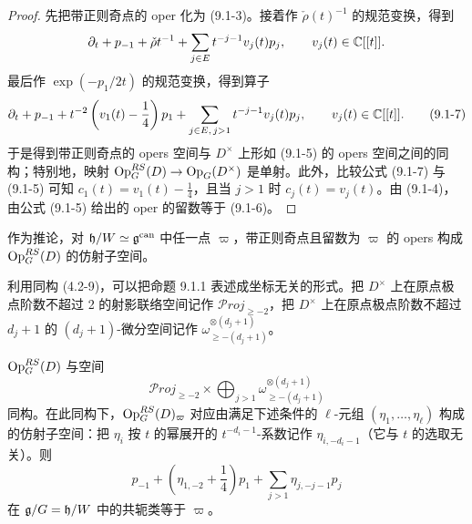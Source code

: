 \begin{proof}
先把带正则奇点的 oper 化为 (9.1-3)。接着作 $\check\rho(t)^{-1}$ 的规范变换，得到
\[
\partial_t + p_{-1} + \check\rho t^{-1} + \sum_{j\in E}t^{-j-1}v_j(t)p_j,\qquad v_j(t)\in\mathbb{C}[[t]].
\]
最后作 $\exp(-p_1/2t)$ 的规范变换，得到算子
\begin{equation}
\partial_t + p_{-1} + t^{-2}\left(v_1(t)-\frac{1}{4}\right)p_1 + \sum_{j\in E,\,j>1}t^{-j-1}v_j(t)p_j,\qquad v_j(t)\in\mathbb{C}[[t]].
\tag{9.1-7}
\end{equation}
于是得到带正则奇点的 opers 空间与 $D^\times$ 上形如 (9.1-5) 的 opers 空间之间的同构；特别地，映射 $\operatorname{Op}^{RS}_G(D)\to\operatorname{Op}_G(D^\times)$ 是单射。此外，比较公式 (9.1-7) 与 (9.1-5) 可知 $c_1(t) = v_1(t)-\frac14$，且当 $j>1$ 时 $c_j(t)=v_j(t)$。由 (9.1-4)，由公式 (9.1-5) 给出的 oper 的留数等于 (9.1-6)。
\end{proof}


作为推论，对 $\mathfrak{h}/W\simeq\mathfrak{g}^{\mathrm{can}}$ 中任一点 $\varpi$，带正则奇点且留数为 $\varpi$ 的 opers 构成 $\operatorname{Op}^{RS}_G(D)$ 的仿射子空间。

利用同构 (4.2-9)，可以把命题 9.1.1 表述成坐标无关的形式。把 $D^\times$ 上在原点极点阶数不超过 2 的射影联络空间记作 $\mathcal{P}roj_{\ge-2}$，把 $D^\times$ 上在原点极点阶数不超过 $d_j+1$ 的 $(d_j+1)$-微分空间记作 $\omega^{\otimes(d_j+1)}_{\ge-(d_j+1)}$。

\begin{corollary}
$\operatorname{Op}^{RS}_G(D)$ 与空间
\[
\mathcal{P}roj_{\ge-2}\times\bigoplus_{j>1}\omega^{\otimes(d_j+1)}_{\ge-(d_j+1)}
\]
同构。在此同构下，$\operatorname{Op}^{RS}_G(D)_\varpi$ 对应由满足下述条件的 $\ell$-元组 $(\eta_1,\dots,\eta_\ell)$ 构成的仿射子空间：把 $\eta_i$ 按 $t$ 的幂展开的 $t^{-d_i-1}$-系数记作 $\eta_{i,-d_i-1}$（它与 $t$ 的选取无关）。则
\[
p_{-1} + \left(\eta_{1,-2}+\frac{1}{4}\right)p_1 + \sum_{j>1}\eta_{j,-j-1}p_j
\]
在 $\mathfrak{g}/G = \mathfrak{h}/W$ 中的共轭类等于 $\varpi$。
\end{corollary}

